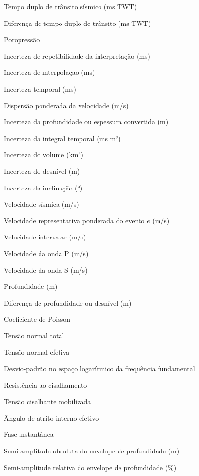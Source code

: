\begin{simbolos}
  \item[$t$] Tempo duplo de trânsito sísmico (ms TWT)
  \item[$\Delta t$] Diferença de tempo duplo de trânsito (ms TWT)
  \item[$u$] Poropressão
  \item[$u_{\mathrm{pick}}$] Incerteza de repetibilidade da interpretação (ms)
  \item[$u_{\mathrm{interp}}$] Incerteza de interpolação (ms)
  \item[$u_t$] Incerteza temporal (ms)
  \item[$u_v$] Dispersão ponderada da velocidade (m/s)
  \item[$u_z$] Incerteza da profundidade ou espessura convertida (m)
  \item[$u_I$] Incerteza da integral temporal (ms m²)
  \item[$u_V$] Incerteza do volume (km³)
  \item[$u_{\Delta z}$] Incerteza do desnível (m)
  \item[$u_\theta$] Incerteza da inclinação (°)
  \item[$v$] Velocidade sísmica (m/s)
  \item[$\overline v_e$] Velocidade representativa ponderada do evento $e$ (m/s)
  \item[$v_{\mathrm{int}}$] Velocidade intervalar (m/s)
  \item[$V_p$] Velocidade da onda P (m/s)
  \item[$V_s$] Velocidade da onda S (m/s)
  \item[$z$] Profundidade (m)
  \item[$\Delta z$] Diferença de profundidade ou desnível (m)
  \item[$\nu$] Coeficiente de Poisson
  \item[$\sigma_n$] Tensão normal total
  \item[$\sigma'_n$] Tensão normal efetiva
  \item[$\sigma_{\ln(f_0)}$] Desvio-padrão no espaço logarítmico da frequência fundamental
  \item[$\tau_f$] Resistência ao cisalhamento
  \item[$\tau_m$] Tensão cisalhante mobilizada
  \item[$\varphi'$] Ângulo de atrito interno efetivo
  \item[$\phi(t)$] Fase instantânea
  \item[$\Delta H_{\mathrm{abs}}$] Semi-amplitude absoluta do envelope de profundidade (m)
  \item[$\Delta H_{\mathrm{rel}}$] Semi-amplitude relativa do envelope de profundidade (\%)
\end{simbolos}
\cleardoublepage
